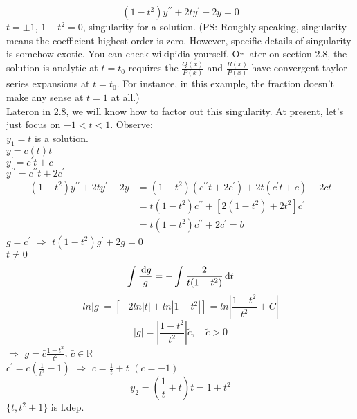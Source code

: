 \begin{example}
\[(1-t^2)y^{\prime\prime}+2ty^\prime-2y=0
\]
$t=\pm1$, $1-t^2=0$, singularity for a solution. (PS: Roughly speaking, singularity means the coefficient highest order is zero. However, specific details of singularity is somehow exotic. You can check wikipidia yourself. Or later on section 2.8, the solution is analytic at $t=t_0$ requires the $\frac{Q(x)}{P(x)}$ and $\frac{R(x)}{P(x)}$ have convergent taylor series expansions at $t=t_0$. For instance, in this example, the fraction doesn't make any sense at $t=1$ at all.)\\
Lateron in 2.8, we will know how to factor out this singularity. At present, let's just focus on $-1<t<1$. Observe:\\
$y_1=t$ is a solution.\\
$y=c(t)t$\\
$y^\prime=c^\prime t+c$\\
$y^{\prime\prime}=c^{\prime\prime}t+2c^\prime$\\
\[\begin{aligned}(1-t^2)y^{\prime\prime}+2ty^\prime-2y&=(1-t^2)(c^{\prime\prime}t+2c^\prime)+2t(c^\prime t+c)-2ct\\
&=t(1-t^2)c^{\prime\prime}+[2(1-t^2)+2t^2]c^\prime\\
&=t(1-t^2)c^{\prime\prime}+2c^\prime=b\end{aligned}\]
$g=c^\prime$ $\Rightarrow$ $t(1-t^2)g^\prime+2g=0$\\
$t\neq0$ 
\[\int\frac{\,\mathrm{d} g}{g}=-\int\frac{2}{t(1-t^2)}\,\mathrm{d} t
\]
\[ln|g|=[-2ln|t|+ln|1-t^2|]=ln|\frac{1-t^2}{t^2}+C|
\]
\[|g|=|\frac{1-t^2}{t^2}|\tilde{c}, \quad\tilde{c}>0
\]
$\Rightarrow$ $g=\bar{c}\frac{1-t^2}{t^2}$, $\bar{c}\in \mathbb{R}$\\
$c^\prime=\bar{c}(\frac{1}{t^2}-1)$ $\Rightarrow$ $c=\frac{1}{t}+t$ $(\bar{c}=-1)$\\
\[y_2=(\frac{1}{t}+t)t=1+t^2
\]
$\{t,t^2+1\}$ is l.dep.
\end{example}
